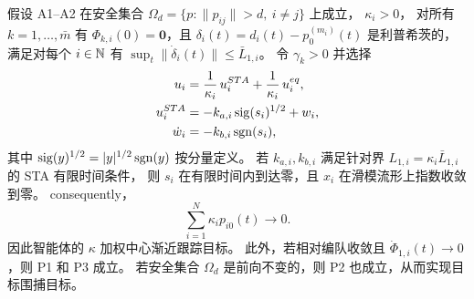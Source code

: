 \begin{theorem}
假设 A1--A2 在安全集合
$\Omega_d=\{p:\|p_{ij}\|>d,\ i\ne j\}$ 上成立，
$\kappa_i>0$，
对所有 $k=1,\dots,\bar m$ 有 $\Phi_{k,i}(0)=\mathbf{0}$，且
$\delta_i(t)=d_i(t)-p_0^{(m_i)}(t)$ 是利普希茨的，
满足对每个 $i\in\mathbb{N}$ 有
$\sup_t\|\dot\delta_i(t)\|\le \bar L_{1,i}$。
令 $\gamma_k>0$ 并选择
\begin{align}
    u_i & =\frac{1}{\kappa_i}\,u_i^{STA}+\frac{1}{\kappa_i}\,u_i^{eq},\\
    u_i^{STA}& =-k_{a,i} \operatorname{sig}(s_i)^{1/2} + w_i,\\
    \dot{w}_i& =-k_{b,i} \operatorname{sgn}(s_i),
\end{align}
其中 $\operatorname{sig}(y)^{1/2}=|y|^{1/2}\operatorname{sgn}(y)$ 按分量定义。
若 $k_{a,i},k_{b,i}$ 满足针对界
$L_{1,i}=\kappa_i\bar L_{1,i}$ 的 STA 有限时间条件，
则 $s_i$ 在有限时间内到达零，且 $x_i$ 在滑模流形上指数收敛到零。
 consequently，
\begin{equation}
    \sum_{i=1}^N \kappa_i p_{i0}(t)\to0.
\end{equation}
因此智能体的 $\kappa$ 加权中心渐近跟踪目标。
此外，若相对编队收敛且 $\dot\Phi_{1,i}(t)\to0$，则 P1 和 P3 成立。
若安全集合 $\Omega_d$ 是前向不变的，则 P2 也成立，从而实现目标围捕目标。
\end{theorem}

